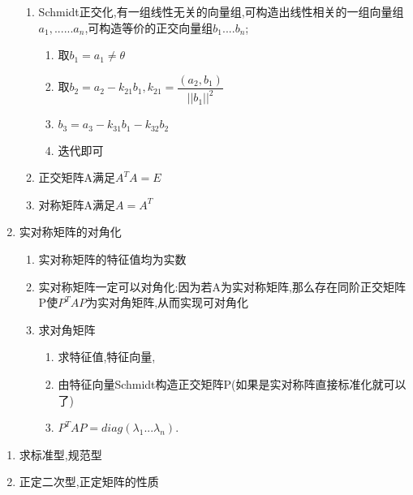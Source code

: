 \documentclass[11pt, a4paper, UTF8]{ctexart}
\begin{document}
\begin{solution}
\begin{enumerate}
\begin{enumerate}
  \item Schmidt正交化,有一组线性无关的向量组,可构造出线性相关的一组向量组$a_1,......a_n$,可构造等价的正交向量组$b_1....b_n$;
  \begin{enumerate}
    \item 取$b_1=a_1\neq \theta$ 
    \item 取$b_2=a_2-k_{21}b_1,k_{21}=\dfrac{(a_2,b_1)}{||b_1||^2}$
    \item $b_3=a_3-k_{31}b_1-k_{32}b_2$
    \item 迭代即可
  \end{enumerate}
  \item 正交矩阵A满足$A^{T}A=E$
  \item 对称矩阵A满足$A=A^{T}$
\end{enumerate}
\item 实对称矩阵的对角化
\begin{enumerate}
  \item 实对称矩阵的特征值均为实数
  \item 实对称矩阵一定可以对角化:因为若A为实对称矩阵,那么存在同阶正交矩阵P使$P^{T}AP$为实对角矩阵,从而实现可对角化
  \item 求对角矩阵
  \begin{enumerate}
    \item 求特征值,特征向量,
    \item 由特征向量Schmidt构造正交矩阵P(如果是实对称阵直接标准化就可以了)
    \item $P^{T}AP=diag(\lambda _1...\lambda _n)$.
  \end{enumerate}
\end{enumerate}
\end{enumerate}
\end{solution}
\begin{problem}[实二次型]
  \begin{enumerate}
  \item 求标准型,规范型
  \item 正定二次型,正定矩阵的性质
  \end{enumerate}
\end{problem}
\end{document}

